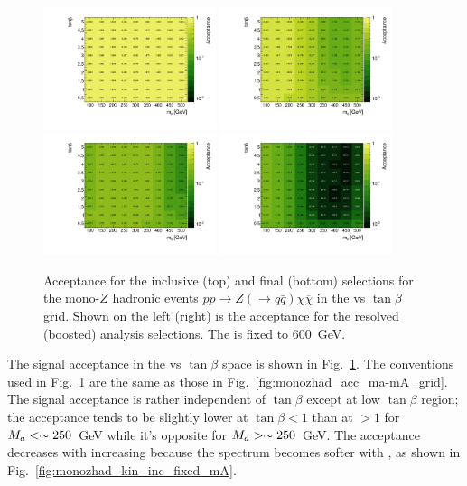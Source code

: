 \begin{figure}
\centering
\includegraphics[width=0.45\textwidth]{texinputs/04_grid/figures/monoz/hadronic/grid_tanb_ma_incl_resl_acc.pdf}
\includegraphics[width=0.45\textwidth]{texinputs/04_grid/figures/monoz/hadronic/grid_tanb_ma_incl_merged_acc.pdf}
\includegraphics[width=0.45\textwidth]{texinputs/04_grid/figures/monoz/hadronic/grid_tanb_ma_resl_acc.pdf}
\includegraphics[width=0.45\textwidth]{texinputs/04_grid/figures/monoz/hadronic/grid_tanb_ma_merged_acc.pdf}
\caption{Acceptance for the inclusive (top) and final (bottom) selections for the mono-$Z$ hadronic events 
$pp \rightarrow Z(\to q\bar{q})\chi\overline{\chi}$ in the \ma vs $\tan\beta$ grid. 
Shown on the left (right) is the acceptance for the resolved (boosted) analysis selections. 
The \mA is fixed to 600~GeV.}
\label{fig:monozhad_acc_ma-tanb_grid}
\end{figure}

The signal acceptance in the \ma vs $\tan\beta$ space is shown in Fig.~\ref{fig:monozhad_acc_ma-tanb_grid}. 
The conventions used in Fig.~\ref{fig:monozhad_acc_ma-tanb_grid} are the same as those in 
Fig.~\ref{fig:monozhad_acc_ma-mA_grid}.
The signal acceptance is rather independent of $\tan\beta$ except at low $\tan\beta$ region; the acceptance 
tends to be slightly lower at $\tan\beta<1$ than at $>1$ for $M_{a}<\sim250$~GeV while it's opposite for 
$M_{a}>\sim250$~GeV. The acceptance decreases with increasing \ma because the \MET spectrum becomes 
softer with \ma, as shown in Fig.~\ref{fig:monozhad_kin_inc_fixed_mA}.


